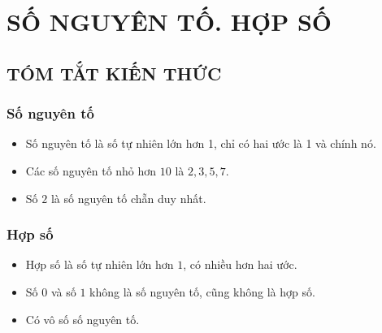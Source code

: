 \section{SỐ NGUYÊN TỐ. HỢP SỐ}
\subsection{TÓM TẮT KIẾN THỨC}
\begin{tomtat}
	\subsubsection{Số nguyên tố}
\begin{itemize}
\item Số nguyên tố là số tự nhiên lớn hơn 1, chỉ có hai ước là 1 và chính nó.
\item Các số nguyên tố nhỏ hơn $10$ là $2, 3, 5, 7$.
\item Số $2$ là số nguyên tố chẵn duy nhất.
\end{itemize}
	\subsubsection{Hợp số}
\begin{itemize}
\item Hợp số là số tự nhiên lớn hơn $1$, có nhiều hơn hai ước.
\end{itemize}
\begin{note}
\begin{itemize}
\item Số $0$ và số $1$ không là số nguyên tố, cũng không là hợp số.
\item Có vô số số nguyên tố.
\end{itemize}
\end{note}
\end{tomtat}
